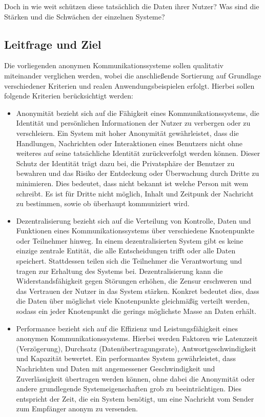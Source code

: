 Doch in wie weit schützen diese tatsächlich die Daten ihrer Nutzer? Was sind die Stärken und die Schwächen der einzelnen Systeme? 

\subsection{Leitfrage und Ziel}

Die vorliegenden anonymen Kommunikationssysteme sollen qualitativ miteinander verglichen werden, wobei die anschließende Sortierung auf Grundlage verschiedener Kriterien und realen Anwendungsbeispielen erfolgt. Hierbei sollen folgende Kriterien berücksichtigt werden:

\begin{itemize}

\item Anonymität bezieht sich auf die Fähigkeit eines Kommunikationssystems, die Identität und persönlichen Informationen der Nutzer zu verbergen oder zu verschleiern. Ein System mit hoher Anonymität gewährleistet, dass die Handlungen, Nachrichten oder Interaktionen eines Benutzers nicht ohne weiteres auf seine tatsächliche Identität zurückverfolgt werden können. Dieser Schutz der Identität trägt dazu bei, die Privatsphäre der Benutzer zu bewahren und das Risiko der Entdeckung oder Überwachung durch Dritte zu minimieren. Dies bedeutet, dass nicht bekannt ist welche Person mit wem schreibt. Es ist für Dritte nicht möglich, Inhalt und Zeitpunk der Nachricht zu bestimmen, sowie ob überhaupt kommuniziert wird.

\item Dezentralisierung bezieht sich auf die Verteilung von Kontrolle, Daten und Funktionen eines Kommunikationssystems über verschiedene Knotenpunkte oder Teilnehmer hinweg. In einem dezentralisierten System gibt es keine einzige zentrale Entität, die alle Entscheidungen trifft oder alle Daten speichert. Stattdessen teilen sich die Teilnehmer die Verantwortung und tragen zur Erhaltung des Systems bei. Dezentralisierung kann die Widerstandsfähigkeit gegen Störungen erhöhen, die Zensur erschweren und das Vertrauen der Nutzer in das System stärken. Konkret bedeutet dies, dass die Daten über möglichst viele Knotenpunkte gleichmäßig verteilt werden, sodass ein jeder Knotenpunkt die gerings möglichste Masse an Daten erhält.

\item Performance bezieht sich auf die Effizienz und Leistungsfähigkeit eines anonymen Kommunikationssystems. Hierbei werden Faktoren wie Latenzzeit (Verzögerung), Durchsatz (Datenübertragungsrate), Antwortgeschwindigkeit und Kapazität bewertet. Ein performantes System gewährleistet, dass Nachrichten und Daten mit angemessener Geschwindigkeit und Zuverlässigkeit übertragen werden können, ohne dabei die Anonymität oder andere grundlegende Systemeigenschaften grob zu beeinträchtigen. Dies entspricht der Zeit, die ein System benötigt, um eine Nachricht vom Sender zum Empfänger anonym zu versenden.


\end{itemize}
